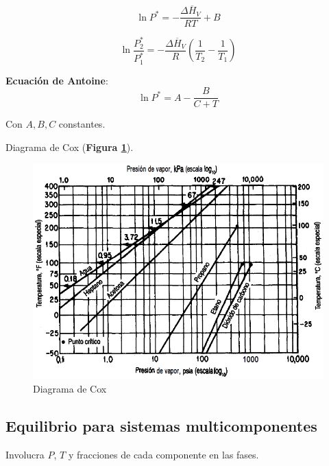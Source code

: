             \begin{equation}
            \label{eq:clausius_clapeyron}
                \ln{P^{*}} = -\frac{\Delta \overline{H}_{V}}{RT} + B
            \end{equation}
            
            \begin{equation}
            \label{eq:clausius_clapeyron_interval}
                \ln{\frac{P_{2}^{*}}{P_{1}^{*}}} = -\frac{\Delta \overline{H}_{V}}{R} \left ( \frac{1}{T_{2}} - \frac{1}{T_{1}} \right )
            \end{equation}
            
            \textbf{Ecuación de Antoine}:
            \begin{equation}
            \label{eq:antoine}
                \ln{P^{*}} = A - \frac{B}{C+T}
            \end{equation}
            
            Con \(A,B,C\) constantes.
            
            Diagrama de Cox (\textbf{Figura \ref{fig:diag_cox}}).
            
            \begin{figure}
                \centering
                \includegraphics[width=.7\textwidth]{img/diagramas/diagrama_cox.png}
                \caption[Diagrama de Cox]{Diagrama de Cox \cite{himmelblau_principios_1997}}
                \label{fig:diag_cox}
            \end{figure}
            
    \subsection{Equilibrio para sistemas multicomponentes}
    
    Involucra \(P\), \(T\) y fracciones de cada componente en las fases.
    
